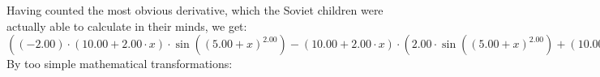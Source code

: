 \documentclass{article}
\begin{document}
 \newline
 \newline 
Having counted the most obvious derivative, which the Soviet children were actually able to calculate in their minds, we get:
$({{{\left({-2.00}\right) \cdot {\left({{10.00} + {{2.00} \cdot {x}}}\right) \cdot  \sin {\left({\left({{5.00} + {x}}\right) ^ {2.00}}\right)} }} - {\left({{10.00} + {{2.00} \cdot {x}}}\right) \cdot \left({{{2.00} \cdot  \sin {\left({\left({{5.00} + {x}}\right) ^ {2.00}}\right)} } + {\left({{10.00} + {{2.00} \cdot {x}}}\right) \cdot { \cos {\left({\left({{5.00} + {x}}\right) ^ {2.00}}\right)}  \cdot \left({{10.00} + {{2.00} \cdot {x}}}\right)}}}\right)}} - {{2.00} \cdot {\left({{10.00} + {{2.00} \cdot {x}}}\right) \cdot  \sin {\left({\left({{5.00} + {x}}\right) ^ {2.00}}\right)} }}})'(x) = {{{{\left({-4.00}\right) \cdot  \sin {\left({\left({{5.00} + {x}}\right) ^ {2.00}}\right)} } - {{2.00} \cdot {\left({{10.00} + {{2.00} \cdot {x}}}\right) \cdot { \cos {\left({\left({{5.00} + {x}}\right) ^ {2.00}}\right)}  \cdot \left({{10.00} + {{2.00} \cdot {x}}}\right)}}}} + {{{\left({-4.00}\right) \cdot  \sin {\left({\left({{5.00} + {x}}\right) ^ {2.00}}\right)} } - {{2.00} \cdot {\left({{10.00} + {{2.00} \cdot {x}}}\right) \cdot { \cos {\left({\left({{5.00} + {x}}\right) ^ {2.00}}\right)}  \cdot \left({{10.00} + {{2.00} \cdot {x}}}\right)}}}} - {\left({{10.00} + {{2.00} \cdot {x}}}\right) \cdot \left({{{2.00} \cdot { \cos {\left({\left({{5.00} + {x}}\right) ^ {2.00}}\right)}  \cdot \left({{10.00} + {{2.00} \cdot {x}}}\right)}} + {{{2.00} \cdot { \cos {\left({\left({{5.00} + {x}}\right) ^ {2.00}}\right)}  \cdot \left({{10.00} + {{2.00} \cdot {x}}}\right)}} + {\left({{10.00} + {{2.00} \cdot {x}}}\right) \cdot \left({{\left({-1.00}\right) \cdot {\left({{10.00} + {{2.00} \cdot {x}}}\right) \cdot {\left({{10.00} + {{2.00} \cdot {x}}}\right) \cdot  \sin {\left({\left({{5.00} + {x}}\right) ^ {2.00}}\right)} }}} + {{2.00} \cdot  \cos {\left({\left({{5.00} + {x}}\right) ^ {2.00}}\right)} }}\right)}}}\right)}}} + {{\left({-4.00}\right) \cdot  \sin {\left({\left({{5.00} + {x}}\right) ^ {2.00}}\right)} } - {{2.00} \cdot {\left({{10.00} + {{2.00} \cdot {x}}}\right) \cdot { \cos {\left({\left({{5.00} + {x}}\right) ^ {2.00}}\right)}  \cdot \left({{10.00} + {{2.00} \cdot {x}}}\right)}}}}}$\newline
\newline
By too simple mathematical transformations:
\end{document}
